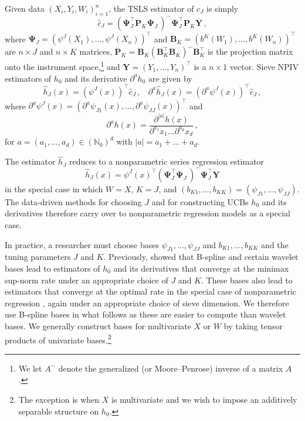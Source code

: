 \documentclass[
]{jss}
\begin{document}
Given data \((X_i,Y_i,W_i)_{i=1}^n\), the TSLS estimator of \(c_J\) is
simply \[
 \hat c_J = \left(\mathbf \Psi_J^\top \mathbf P_K^{\phantom \top} \mathbf \Psi_J^{\phantom \top} \right)^{-} \mathbf \Psi_J^\top \mathbf P_K^{\phantom \top} \mathbf Y \,,
\] where \(\mathbf \Psi_J = (\psi^J({X_1}),\ldots,\psi^J({X_n}))^\top\)
and \(\mathbf B_K = (b^K({W_1}),\ldots,b^K({W_n}))^\top\) are
\(n \times J\) and \(n \times K\) matrices,
\(\mathbf P_K = \mathbf B_K^{\phantom \prime} (\mathbf B_K^\top \mathbf B_K^{\phantom \top})^{-} \mathbf B_K^\top\)
is the projection matrix onto the instrument space,\footnote{We let
  \(A^-\) denote the generalized (or Moore--Penrose) inverse of a matrix
  \(A\).} and \(\mathbf Y = (Y_1,\ldots,Y_n)^\top\) is a \(n \times 1\)
vector. Sieve NPIV estimators of \(h_0\) and its derivative
\(\partial^a h_0\) are given by \[
 \hat h_J(x) = (\psi^J(x))^\top \hat c_J \,,~~~~\partial^a \hat h_J(x) =(\partial^a \psi^J(x))^\top \hat c_J \,,
\] where
\(\partial^a \psi^J(x) = (\partial^a \psi_{J1}(x),\ldots,\partial^a \psi_{JJ}(x))^\top\)
and \[
 \partial^a h(x) = \frac{\partial^{|a|} h(x)}{\partial^{a_1} x_1 \ldots \partial^{a_d} x_d} \,,
\] for \(a = (a_1,\ldots,a_d) \in (\mathbb{N}_0)^d\) with
\(|a| = a_1 + \ldots + a_d\).

The estimator \(\hat h_J\) reduces to a nonparametric series regression
estimator \[
 \hat h_J(x) = \psi^J(x)^\top(\mathbf \Psi_J^\top\mathbf \Psi_J^{\phantom \top})^- \mathbf \Psi_J^\top \mathbf Y
\] in the special case in which \(W = X\), \(K = J\), and
\((b_{K1},\ldots,b_{KK}) = (\psi_{J1},\ldots,\psi_{JJ})\). The
data-driven methods for choosing \(J\) and for constructing UCBs \(h_0\)
and its derivatives therefore carry over to nonparametric regression
models as a special case.

In practice, a researcher must choose bases
\(\psi_{J1},\ldots,\psi_{JJ}\) and \(b_{K1},\ldots,b_{KK}\) and the
tuning parameters \(J\) and \(K\). Previously, \citet{CCQE} showed that
B-spline and certain wavelet bases lead to estimators of \(h_0\) and its
derivatives that converge at the minimax sup-norm rate under an
appropriate choice of \(J\) and \(K\). These bases also lead to
estimators that converge at the optimal rate in the special case of
nonparametric regression \citep{BCCK, CC15Reg}, again under an
appropriate choice of sieve dimension. We therefore use B-spline bases
in what follows as these are easier to compute than wavelet bases. We
generally construct bases for multivariate \(X\) or \(W\) by taking
tensor products of univariate bases.\footnote{The exception is when
  \(X\) is multivariate and we wish to impose an additively separable
  structure on \(h_0\).}
\end{document}
